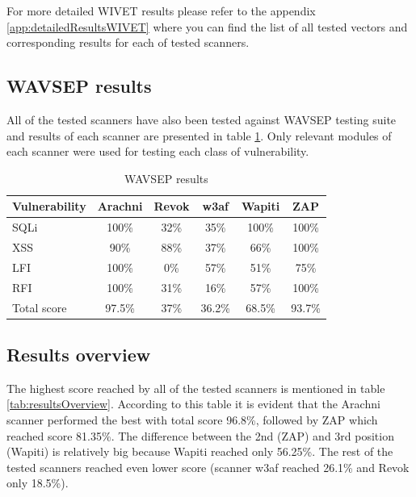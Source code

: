 	
	For more detailed WIVET results please refer to the appendix \ref{app:detailedResultsWIVET} where you can find the list of all tested vectors and corresponding results for each of tested scanners.
	
	\subsection{WAVSEP results}\label{wavsep-results}
	
	All of the tested scanners have also been tested against WAVSEP testing suite and results of each scanner are presented in table \ref{tab:resultsWavsep}. Only relevant modules of each scanner were used for testing each class of vulnerability. 
	
	\begin {table}[H]
	\begin{center}
	\bgroup
	\def\arraystretch{1.2}
	\begin{tabular}{| l | ccccc |}
    \hline
	Vulnerability		& Arachni		& Revok 	& w3af		& Wapiti		& ZAP \\ \hline
	SQLi				& 100\%			& 32\%		& 35\%		& 100\%			& 100\% \\ \hline
	XSS					& 90\%			& 88\%		& 37\%		& 66\%			& 100\% \\ \hline
	LFI					& 100\%			& 0\%		& 57\%		& 51\%			& 75\% \\ \hline
	RFI					& 100\%			& 31\%		& 16\%		& 57\%			& 100\%	 \\ \hline
	Total score			& 97.5\%		& 37\%		& 36.2\%	& 68.5\%		& 93.7\% \\ \hline
	\end{tabular}
	\egroup
	\caption{WAVSEP results}
	\label{tab:resultsWavsep} 
	\end{center}
	\end {table}
	
	\subsection{Results overview}
	
	The highest score reached by all of the tested scanners is mentioned in table \ref{tab:resultsOverview}. According to this table it is evident that the Arachni scanner performed the best with total score 96.8\%, followed by ZAP which reached score 81.35\%. The difference between the 2nd (ZAP) and 3rd position (Wapiti) is relatively big because Wapiti reached only 56.25\%. The rest of the tested scanners reached even lower score (scanner w3af reached 26.1\% and Revok only 18.5\%).
	

